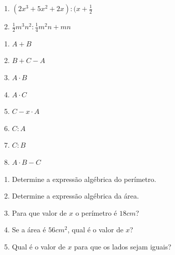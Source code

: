 \begin{exercicios}
\begin{multicols}{2}
\begin{enumerate}[label=\alph*)]
    \item $(2x^3+5x^2+2x) : (x+\frac{1}{2}$
    
    \item $\frac{1}{2}m^3n^2 : \frac{1}{4}m^2n+mn$
\end{enumerate}

\end{multicols}


\begin{multicols}{4}

\begin{enumerate}[label=\alph*)]
    \item $A+B$
    
    \item $B+C-A$
    
    \item $A \cdot B$
    
    \item $A \cdot C$
    
    \item $C - x \cdot A$
    
    \item $C:A$
    
    \item $C:B$
    
    \item $A \cdot B-C$
\end{enumerate}

\end{multicols}


\begin{enumerate}[label=\alph*)]
\item Determine a expressão algébrica do perímetro.

\item Determine a expressão algébrica da área.

\item Para que valor de $x$ o perímetro é $18cm$?

\item Se a área é $56cm^2$, qual é o valor de $x$?

\item Qual é o valor de $x$ para que os lados sejam iguais?
\end{enumerate}


\end{exercicios}
